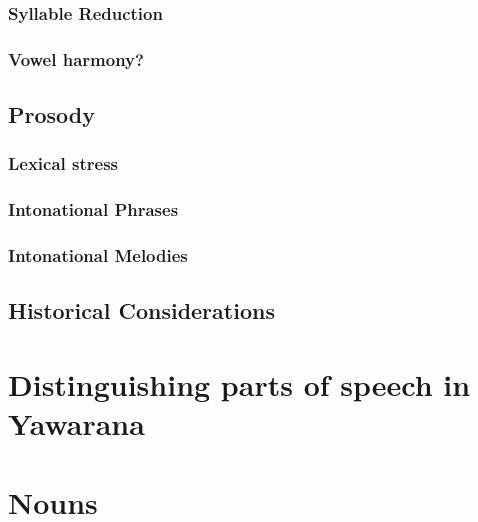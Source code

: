 \documentclass{memoir}
\begin{document}
\subsection{\texorpdfstring{Syllable Reduction
\label{sec:sylred}}{Syllable Reduction }}

\subsection{\texorpdfstring{Vowel harmony?
\label{sec:vowelharm}}{Vowel harmony? }}

\section{\texorpdfstring{Prosody \label{sec:prosody}}{Prosody }}

\subsection{\texorpdfstring{Lexical stress
\label{sec:stress}}{Lexical stress }}

\subsection{\texorpdfstring{Intonational Phrases
\label{sec:intphrases}}{Intonational Phrases }}

\subsection{\texorpdfstring{Intonational Melodies
\label{sec:intmelodies}}{Intonational Melodies }}

\section{\texorpdfstring{Historical Considerations
\label{sec:histphono}}{Historical Considerations }}

\chapter{\texorpdfstring{Distinguishing parts of speech in Yawarana
\label{POS}}{Distinguishing parts of speech in Yawarana }}

\chapter{\texorpdfstring{Nouns \label{nouns}}{Nouns }}
\end{document}
